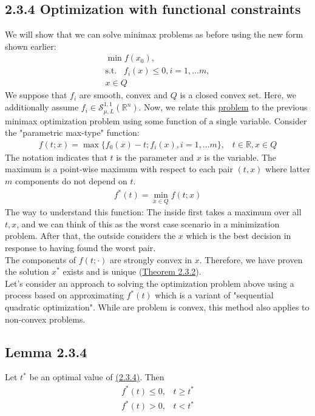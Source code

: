 \documentclass[12pt,a4paper]{article}
\begin{document}
	 \subsection*{2.3.4 Optimization with functional constraints}\label{sec:234}
	 We will show that we can solve minimax problems as before using the new form shown earlier:
	 \begin{align*}
	 	\min f(x_0), \\
	 	\text{s.t.} \hspace{10pt} f_i(x) \leq 0, i = 1, \ldots m, \\
	 	x \in Q
	 \end{align*}
	 We suppose that $f_i$ are smooth, convex and $Q$ is a closed convex set. Here, we additionally assume $f_i \in \mathcal{S}_{\mu,L}^{1,1}(\mathbb{R}^n)$. Now, we relate this \hyperref[sec:234]{problem} to the previous minimax optimization problem using some function of a single variable. Consider the "parametric max-type" function:
	 \begin{align*}
	 	f(t;x) = \max\{f_0(x) - t;f_i(x),i= 1, \ldots m\}, \hspace{10pt} t \in \mathbb{R}, x \in Q
	 \end{align*}
	  The notation indicates that $t$ is the parameter and $x$ is the variable. The maximum is a point-wise maximum with respect to each pair $(t, x)$ where latter $m$ components do not depend on $t$. 
	 \begin{align*}
	 	f^*(t) = \min_{x \in Q}f(t;x)
	 \end{align*}
	 The way to understand this function: The inside first takes a maximum over all $t,x$, and we can think of this as the worst case scenario in a minimization problem. After that, the outside considers the $x$ which is the best decision in response to having found the worst pair. \\
	 The components of $f(t;\cdot)$ are strongly convex in $x$. Therefore, we have proven the solution $x^*$ exists and is unique (\hyperref[thm232]{Theorem 2.3.2}). \\
	 Let's consider an approach to solving the optimization problem above using a process based on approximating $f^*(t)$ which is a variant of "sequential quadratic optimization". While are problem is convex, this method also applies to non-convex problems.
	 \subsection*{Lemma 2.3.4}\label{lem234}
	 Let $t^*$ be an optimal value of \hyperref[sec:234]{(2.3.4)}. Then
	 \begin{align*}
	 	f^*(t) \leq 0, \hspace{10pt} t \geq t^*  \\
	 	f^*(t) > 0, \hspace{10pt} t < t^*
	 \end{align*}
	 
\end{document}

